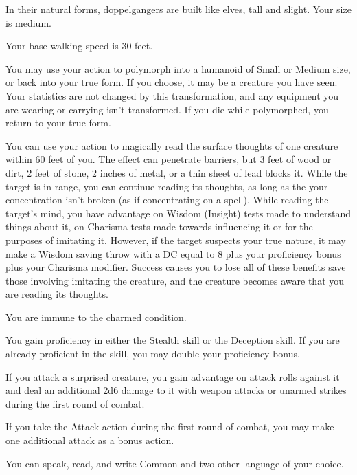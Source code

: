 {In their natural forms, doppelgangers are built like elves, tall and slight. Your size is medium.}

{Your base walking speed is 30 feet.}

{You may use your action to polymorph into a humanoid of Small or Medium size, or back into your true form. If you choose, it may be a creature you have seen. Your statistics are not changed by this transformation, and any equipment you are wearing or carrying isn’t transformed. If you die while polymorphed, you return to your true form.}

{You can use your action to magically read the surface thoughts of one creature within 60 feet of you. The effect can penetrate barriers, but 3 feet of wood or dirt, 2 feet of stone, 2 inches of metal, or a thin sheet of lead blocks it. While the target is in range, you can continue reading its thoughts, as long as the your concentration isn’t broken (as if concentrating on a spell). While reading the target’s mind, you have advantage on Wisdom (Insight) tests made to understand things about it, on Charisma tests made towards influencing it or for the purposes of imitating it. However, if the target suspects your true nature, it may make a Wisdom saving throw with a DC equal to 8 plus your proficiency bonus plus your Charisma modifier. Success causes you to lose all of these benefits save those involving imitating the creature, and the creature becomes aware that you are reading its thoughts.}

{You are immune to the charmed condition.}

{You gain proficiency in either the Stealth skill or the Deception skill. If you are already proficient in the skill, you may double your proficiency bonus.}

{If you attack a surprised creature, you gain advantage on attack rolls against it and deal an additional 2d6 damage to it with weapon attacks or unarmed strikes during the first round of combat.}

{If you take the Attack action during the first round of combat, you may make one additional attack as a bonus action.}

{You can speak, read, and write Common and two other language of your choice.}

